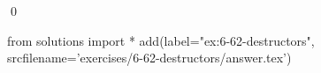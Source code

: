 
\begin{ex}
  \label{ex:6-62-destructors}
  
  \qed
\end{ex}
\begin{python0}
from solutions import *
add(label="ex:6-62-destructors",
    srcfilename='exercises/6-62-destructors/answer.tex')
\end{python0}

